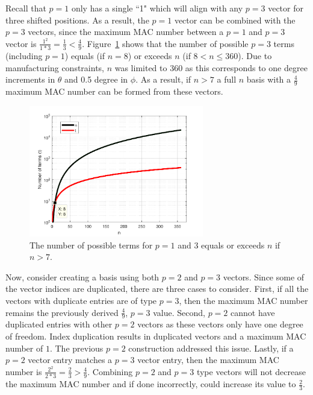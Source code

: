 \documentclass[3p,times]{elsarticle}
\begin{document}
Recall that $p=1$ only has a single ``1" which will align with any $p=3$ vector for three shifted positions.  
As a result, the $p=1$ vector can be combined with the $p=3$ vectors, since the maximum MAC number between a $p=1$ and $p=3$ vector is $\frac{1^2}{1*3}=\frac{1}{3} < \frac{4}{9}$.  
Figure~\ref{fig:terms} shows that the number of possible $p=3$ terms (including $p=1$) equals (if $n=8$) or exceeds $n$ (if $8<n\le 360$).  
Due to manufacturing constraints, $n$ was limited to 360 as this corresponds to one degree increments in $\theta$ and 0.5 degree in $\phi$.  
As a result, if $n>7$ a full $n$ basis with a $\frac{4}{9}$ maximum MAC number can be formed from these vectors.

\begin{figure}[ht!]
\includegraphics[width={3.0in}]{../figs/TermPlot.pdf}
\centering
\caption{The number of possible terms for $p=1$ and 3 equals or exceeds $n$ if $n>7$.}
\label{fig:terms}
\end{figure}

Now, consider creating a basis using both $p=2$ and $p=3$ vectors.  Since some of the vector indices are duplicated, there are three cases to consider.
First, if all the vectors with duplicate entries are of type $p=3$, then the maximum MAC number remains the previously derived $\frac{4}{9}$, $p=3$ value.  
Second, $p=2$ cannot have duplicated entries with other $p=2$ vectors as these vectors only have one degree of freedom.  Index duplication
results in duplicated vectors and a maximum MAC number of $1$.  The previous $p=2$ construction addressed this issue.
Lastly, if a $p=2$ vector entry matches a $p=3$ vector entry, then the maximum MAC number is $\frac{2^2}{2*3}=\frac{2}{3}>\frac{4}{9}$.  
Combining $p=2$ and $p=3$ type vectors will not decrease the maximum MAC number and if done incorrectly, could increase its value
to $\frac{2}{3}$.
\end{document}
